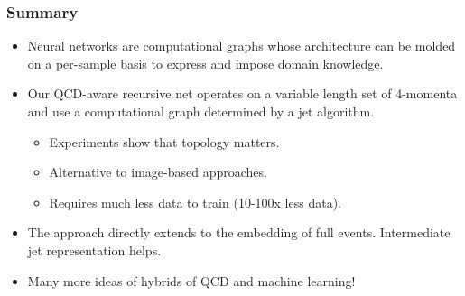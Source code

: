 \documentclass{beamer}
\begin{document}
\begin{frame}
    \frametitle{Summary}

    \begin{itemize}
        \item Neural networks are computational graphs whose architecture can be molded on a per-sample basis to express and impose domain knowledge.

        \item Our QCD-aware recursive net operates on a variable length set of 4-momenta and use a computational graph determined by a jet algorithm.

        \begin{itemize}
            \item Experiments show that topology matters.
            \item Alternative to image-based approaches.
            \item Requires much less data to train (10-100x less data).
        \end{itemize}

        \item The approach directly extends to the embedding of full events. Intermediate jet representation helps.

        \item Many more ideas of hybrids of QCD and machine learning!
    \end{itemize}

\end{frame}
\end{document}
